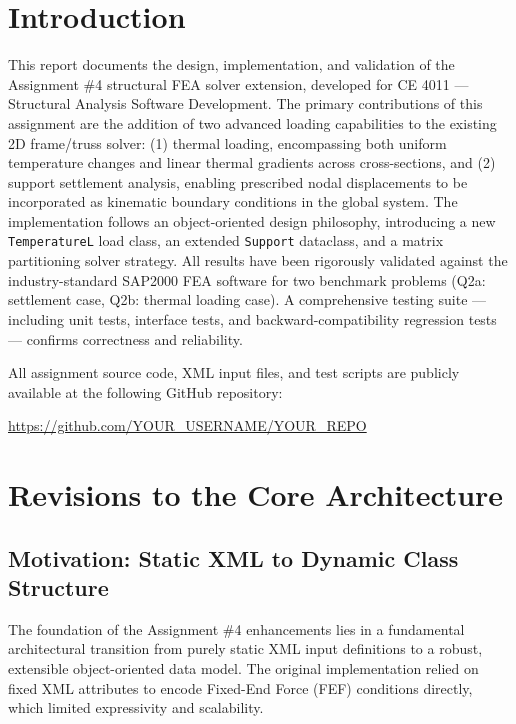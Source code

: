 \documentclass[12pt,a4paper]{article}
\begin{document}
\section{Introduction}

This report documents the design, implementation, and validation of the Assignment \#4 structural FEA solver extension, developed for CE 4011 --- Structural Analysis Software Development. The primary contributions of this assignment are the addition of two advanced loading capabilities to the existing 2D frame/truss solver: (1) thermal loading, encompassing both uniform temperature changes and linear thermal gradients across cross-sections, and (2) support settlement analysis, enabling prescribed nodal displacements to be incorporated as kinematic boundary conditions in the global system. The implementation follows an object-oriented design philosophy, introducing a new \texttt{TemperatureL} load class, an extended \texttt{Support} dataclass, and a matrix partitioning solver strategy. All results have been rigorously validated against the industry-standard SAP2000 FEA software for two benchmark problems (Q2a: settlement case, Q2b: thermal loading case). A comprehensive testing suite --- including unit tests, interface tests, and backward-compatibility regression tests --- confirms correctness and reliability.

All assignment source code, XML input files, and test scripts are publicly available at the following GitHub repository:

\begin{center}
    \url{https://github.com/YOUR_USERNAME/YOUR_REPO}
\end{center}


\section{Revisions to the Core Architecture}

\subsection{Motivation: Static XML to Dynamic Class Structure}

The foundation of the Assignment \#4 enhancements lies in a fundamental architectural transition from purely static XML input definitions to a robust, extensible object-oriented data model. The original implementation relied on fixed XML attributes to encode Fixed-End Force (FEF) conditions directly, which limited expressivity and scalability.
\end{document}
